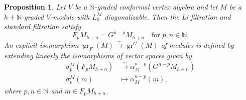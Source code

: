 \documentclass[a4paper, 12pt, reqno]{amsart}
\newtheorem{proposition}[theorem]{Proposition}
\theoremstyle{remark}
\numberwithin{equation}{subsection}
\DeclareMathOperator{\gr}{gr}
\begin{document}
\begin{proposition}
  \label{prp:12}
  Let $V$ be a $\mathbb{N}$-graded conformal vertex algebra and let $M$ be a $h + \mathbb{N}$-graded $V$-module with $L_0^M$ diagonalizable.
  Then the Li filtration and standard filtration satisfy
  \begin{equation*}
    F_pM_{h + n} = G^{n - p}M_{h + n} \quad \text{for }p, n \in \mathbb{N}.
  \end{equation*}
  An explicit isomorphism $\gr_F(M) \xrightarrow{\sim} \gr^G(M)$ of modules is defined by extending linearly the isomorphisms of vector spaces given by
  \begin{align*}
    \sigma^M_p(F_pM_{h + n}) &\xrightarrow{\sim} \alpha^{n - p}_M(G^{n - p}M_{h + n}) \\
    \sigma^M_p(m) &\mapsto \alpha^{n - p}_M(m),
  \end{align*}
  where $p, n\in \mathbb{N}$ and $m \in F_pM_{h + n}$.
\end{proposition}
\end{document}
